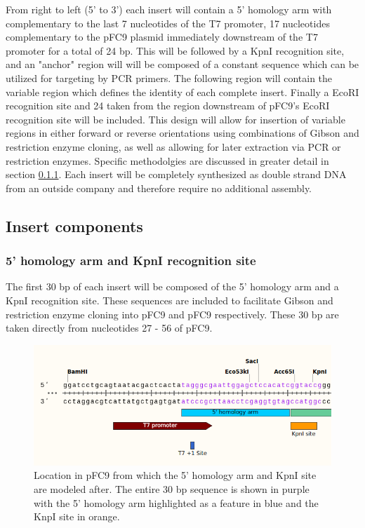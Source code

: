 \documentclass[11pt]{article}
\begin{document}
From right to left (5' to 3') each insert will contain a 5' homology arm with complementary to the last 7 nucleotides of the T7 promoter, 17 nucleotides complementary to the pFC9 plasmid immediately downstream of the T7 promoter for a total of 24 bp. This will be followed by a KpnI recognition site, and an "anchor" region will will be composed of a constant sequence which can be utilized for targeting by PCR primers. The following region will contain the variable region which defines the identity of each complete insert. Finally a EcoRI recognition site and 24 taken from the region downstream of pFC9's EcoRI recognition site will be included. This design will allow for insertion of variable regions in either forward or reverse orientations using combinations of Gibson and restriction enzyme cloning, as well as allowing for later extraction via PCR or restriction enzymes. Specific methodolgies are discussed in greater detail in section \ref{}. Each insert will be completely synthesized as double strand DNA from an outside company and therefore require no additional assembly. 

\subsection{Insert components}

\subsubsection{5' homology arm and KpnI recognition site}

The first 30 bp of each insert will be composed of the 5' homology arm and a KpnI recognition site. These sequences are included to facilitate Gibson and restriction enzyme cloning into pFC9 and pFC9 respectively. These 30 bp are taken directly from nucleotides 27 - 56 of pFC9.

\begin{figure}[h]
	\includegraphics[width=12cm]{images/variable_region/5_homology_arm.png}
	\centering
	\caption{Location in pFC9 from which the 5' homology arm and KpnI site are modeled after. The entire 30 bp sequence is shown in purple with the 5' homology arm highlighted as a feature in blue and the KnpI site in orange.}
	\label{fig:1}
\end{figure}
\end{document}
